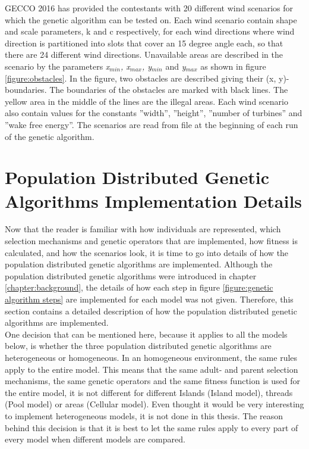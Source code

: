 GECCO 2016 has provided the contestants with 20 different wind scenarios for which the genetic algorithm can be tested on. Each wind scenario contain shape and scale parameters, k and c respectively, for each wind directions where wind direction is partitioned into slots that cover an 15 degree angle each, so that there are 24 different wind directions. Unavailable areas are described in the scenario by the parameters \textit{x$_{min}$, x$_{max}$, y$_{min}$} and \textit{y$_{max}$} as shown in figure \ref{figure:obstacles}. In the figure, two obstacles are described giving their (x, y)-boundaries. The boundaries of the obstacles are marked with black lines. The yellow area in the middle of the lines are the illegal areas. Each wind scenario also contain values for the constants ''width'', ''height'', ''number of turbines'' and ''wake free energy''. The scenarios are read from file at the beginning of each run of the genetic algorithm. 


\section{Population Distributed Genetic Algorithms Implementation Details}\label{section:population distributed gas implementation details}


Now that the reader is familiar with how individuals are represented, which selection mechanisms and genetic operators that are implemented, how fitness is calculated, and how the scenarios look, it is time to go into details of how the population distributed genetic algorithms are implemented. Although the population distributed genetic algorithms were introduced in chapter \ref{chapter:background}, the details of how each step in figure \ref{figure:genetic algorithm steps} are implemented for each model was not given. Therefore, this section contains a detailed description of how the population distributed genetic algorithms are implemented. \\


\noindent One decision that can be mentioned here, because it applies to all the models below, is whether the three population distributed genetic algorithms are heterogeneous or homogeneous. In an homogeneous environment, the same rules apply to the entire model. This means that the same adult- and parent selection mechanisms, the same genetic operators and the same fitness function is used for the entire model, it is not different for different Islands (Island model), threads (Pool model) or areas (Cellular model). Even thought it would be very interesting to implement heterogeneous models, it is not done in this thesis. The reason behind this decision is that it is best to let the same rules apply to every part of every model when different models are compared.\\


